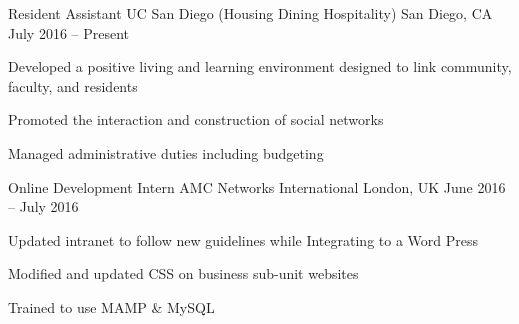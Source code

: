 \documentclass[]{awesome-cv}
\begin{document}
\begin{cventries}
	\cventry
	{Resident Assistant}
	{UC San Diego (Housing Dining Hospitality)}
	{San Diego, CA}
	{July 2016 – Present}
	{\begin{cvitems}
		\item {Developed a positive living and learning environment designed to link community, faculty, and residents}
		\item {Promoted the interaction and construction of social networks}
		\item {Managed administrative duties including budgeting}
	\end{cvitems}}
	
	\cventry
	{Online Development Intern}
	{AMC Networks International}
	{London, UK}
	{June 2016 – July 2016}
	{\begin{cvitems}
		\item {Updated intranet to follow new guidelines while Integrating to a Word Press}
		\item {Modified and updated CSS on business sub-unit websites}
		\item {Trained to use MAMP \& MySQL}
		\end{cvitems}}
\end{cventries}
\end{document}

